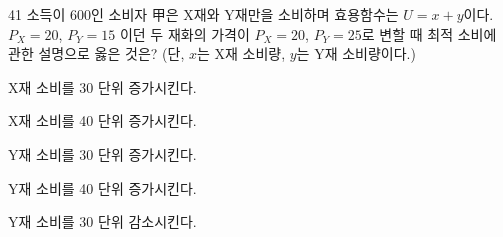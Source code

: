 \begin{question}{41}
소득이 600인 소비자 甲은 X재와 Y재만을 소비하며 효용함수는 $U=x+y$이다. $P_{X}=20$, $P_{Y}=15$ 이던 두 재화의 가격이 $P_{X}=20$, $P_{Y}=25$로 변할 때 최적 소비에 관한 설명으로 옳은 것은? (단, $x$는 X재 소비량, $y$는 Y재 소비량이다.)
\begin{choices}
  \item X재 소비를 30 단위 증가시킨다.
  \item X재 소비를 40 단위 증가시킨다.
  \item Y재 소비를 30 단위 증가시킨다.
  \item Y재 소비를 40 단위 증가시킨다.
  \item Y재 소비를 30 단위 감소시킨다.
\end{choices}
\end{question}
